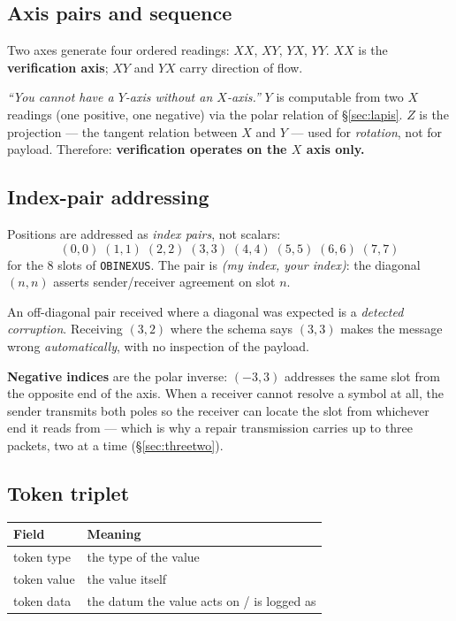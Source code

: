 \documentclass[11pt,a4paper]{article}
\newcommand{\OBI}{\texttt{OBINEXUS}}
\begin{document}
\subsection{Axis pairs and sequence}

Two axes generate four ordered readings: $XX$, $XY$, $YX$, $YY$. $XX$ is the
\textbf{verification axis}; $XY$ and $YX$ carry direction of flow.

\begin{ruleblock}
\emph{``You cannot have a $Y$-axis without an $X$-axis.''} $Y$ is computable
from two $X$ readings (one positive, one negative) via the polar relation of
\S\ref{sec:lapis}. $Z$ is the projection --- the tangent relation between $X$
and $Y$ --- used for \emph{rotation}, not for payload. Therefore:
\textbf{verification operates on the $X$ axis only.}
\end{ruleblock}

\subsection{Index-pair addressing}
\label{sec:index}

Positions are addressed as \emph{index pairs}, not scalars:
\[
(0,0)\;(1,1)\;(2,2)\;(3,3)\;(4,4)\;(5,5)\;(6,6)\;(7,7)
\]
for the 8 slots of \OBI{}. The pair is \emph{(my index, your index)}: the
diagonal $(n,n)$ asserts sender/receiver agreement on slot $n$.

An off-diagonal pair received where a diagonal was expected is a \emph{detected
corruption}. Receiving $(3,2)$ where the schema says $(3,3)$ makes the message
wrong \emph{automatically}, with no inspection of the payload.

\textbf{Negative indices} are the polar inverse: $(-3,3)$ addresses the same
slot from the opposite end of the axis. When a receiver cannot resolve a symbol
at all, the sender transmits both poles so the receiver can locate the slot from
whichever end it reads from --- which is why a repair transmission carries up to
three packets, two at a time (\S\ref{sec:threetwo}).

\subsection{Token triplet}
\label{sec:triplet}

\begin{center}
\begin{tabular}{@{}ll@{}}
\toprule
\textbf{Field} & \textbf{Meaning} \\
\midrule
token type  & the type of the value \\
token value & the value itself \\
token data  & the datum the value acts on / is logged as \\
\bottomrule
\end{tabular}
\end{center}
\end{document}
